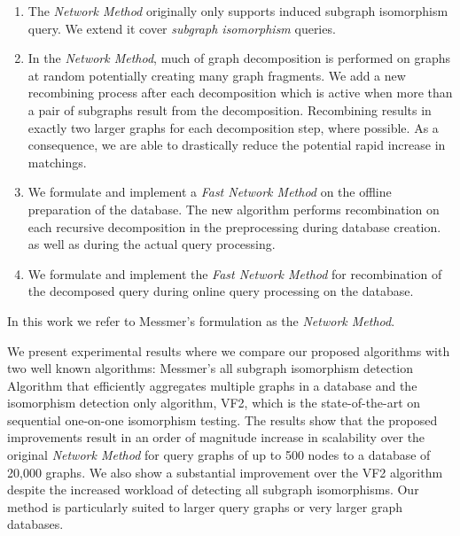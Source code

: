 \begin{enumerate}
\item The \textit{Network Method} originally only supports induced subgraph isomorphism query. We extend it  cover \textit{subgraph isomorphism} queries.
\item  In the \textit{Network Method}, much of graph decomposition is performed on graphs at random potentially creating many graph fragments. We add a new recombining 
process after each decomposition which is active when more than a pair of  subgraphs result from the decomposition.  Recombining results in exactly  two larger 
graphs for each decomposition step, where possible.  As a consequence, we are able to drastically reduce the potential rapid increase in matchings. 
\item We formulate and implement  a  \textit{Fast Network Method} on the offline preparation of the database. The new algorithm performs recombination 
on  each recursive decomposition in the  preprocessing during database creation. as well as during the actual query processing. 
\item We formulate and implement the \textit{Fast Network Method} for recombination of the decomposed query during  online query processing on the database.
\end{enumerate}

In this work we refer to Messmer's formulation as the \textit{Network Method}.


We present experimental results where we compare our proposed algorithms with two well known algorithms: Messmer's\cite{messmer_bunke2000} all subgraph isomorphism 
detection Algorithm that efficiently aggregates multiple graphs in a database and the isomorphism detection only algorithm, VF2\cite{cordella2001_vf2}, which is the 
state-of-the-art on sequential one-on-one isomorphism testing. The results show that the proposed improvements result in an order of magnitude increase in scalability 
over the original \textit{Network Method}  for query graphs of up to 500 nodes to a database of 20,000 graphs. We also show a substantial improvement over the VF2 
algorithm despite the increased workload of detecting all subgraph isomorphisms. Our method is particularly suited to larger query graphs or very larger graph 
databases.
